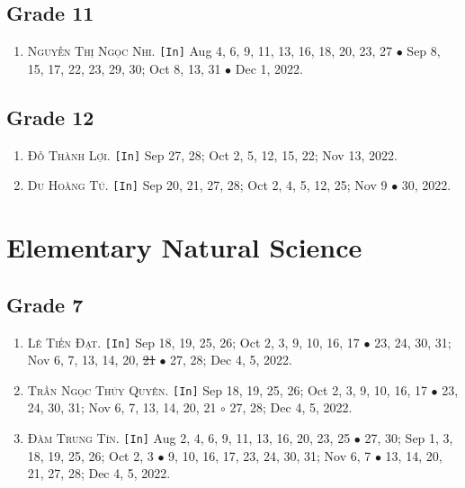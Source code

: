 \documentclass{article}
\numberwithin{equation}{section}
\begin{document}
\subsection{Grade 11}
\begin{enumerate}
	\item \textsc{Nguyễn Thị Ngọc Nhi.} \texttt{[In]} Aug 4, 6, 9, 11, 13, 16, 18, 20, 23, 27 $\bullet$ Sep 8, 15, 17, 22, 23, 29, 30; Oct 8, 13, 31 $\bullet$ Dec 1, 2022.
\end{enumerate}

\subsection{Grade 12}
\begin{enumerate}
	\item \textsc{Đỗ Thành Lợi.} \texttt{[In]} Sep 27, 28; Oct 2, 5, 12, 15, 22; Nov 13, 2022.
	\item \textsc{Du Hoàng Tú.} \texttt{[In]} Sep 20, 21, 27, 28; Oct 2, 4, 5, 12, 25; Nov 9 $\bullet$ 30, 2022.
\end{enumerate}


\section{Elementary Natural Science}

\subsection{Grade 7}
\begin{enumerate}
	\item \textsc{Lê Tiến Đạt.} \texttt{[In]} Sep 18, 19, 25, 26; Oct 2, 3, 9, 10, 16, 17 $\bullet$ 23, 24, 30, 31; Nov 6, 7, 13, 14, 20, \st{21} $\bullet$ 27, 28; Dec 4, 5, 2022.
	\item \textsc{Trần Ngọc Thúy Quyên.} \texttt{[In]} Sep 18, 19, 25, 26; Oct 2, 3, 9, 10, 16, 17 $\bullet$ 23, 24, 30, 31; Nov 6, 7, 13, 14, 20, 21 $\circ$ 27, 28; Dec 4, 5, 2022.
	\item \textsc{Đàm Trung Tín.} \texttt{[In]} Aug 2, 4, 6, 9, 11, 13, 16, 20, 23, 25 $\bullet$ 27, 30; Sep 1, 3, 18, 19, 25, 26; Oct 2, 3 $\bullet$ 9, 10, 16, 17, 23, 24, 30, 31; Nov 6, 7 $\bullet$ 13, 14, 20, 21, 27, 28; Dec 4, 5, 2022.
\end{enumerate}

\end{document}

